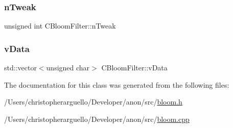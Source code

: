 \subsubsection{\texorpdfstring{n\+Tweak}{nTweak}}
{\footnotesize\ttfamily unsigned int C\+Bloom\+Filter\+::n\+Tweak\hspace{0.3cm}{\ttfamily [private]}}

\mbox{\label{class_c_bloom_filter_a494abe120d62978951cc0f0db916f50e}} 
\subsubsection{\texorpdfstring{v\+Data}{vData}}
{\footnotesize\ttfamily std\+::vector$<$unsigned char$>$ C\+Bloom\+Filter\+::v\+Data\hspace{0.3cm}{\ttfamily [private]}}



The documentation for this class was generated from the following files\+:\begin{DoxyCompactItemize}
\item 
/\+Users/christopherarguello/\+Developer/anon/src/\mbox{\hyperlink{bloom_8h}{bloom.\+h}}\item 
/\+Users/christopherarguello/\+Developer/anon/src/\mbox{\hyperlink{bloom_8cpp}{bloom.\+cpp}}\end{DoxyCompactItemize}

